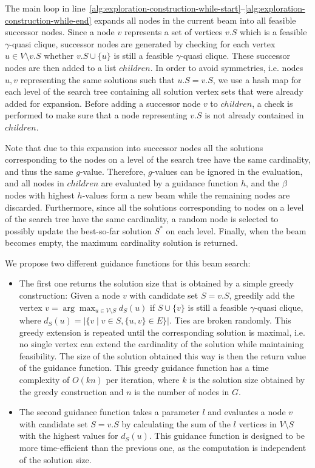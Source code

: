 \documentclass[draft,final]{vutinfth} %
\begin{document}
The main loop in line~\ref{alg:exploration-construction-while-start}--\ref{alg:exploration-construction-while-end} expands all nodes in the current beam into all feasible successor nodes. 
Since a node $v$ represents a set of vertices $\mathit{v.S}$ which is a feasible $\gamma$-quasi clique, successor nodes are generated by checking for each vertex $u \in V \setminus \mathit{v.S}$ whether $\mathit{v.S} \cup \{u\}$ is still a feasible $\gamma$-quasi clique. 
These successor nodes are then added to a list $\mathit{children}$. 
In order to avoid symmetries, i.e. nodes $u,v$ representing the same solutions such that $u.S = v.S$, we use a hash map for each level of the search tree containing all solution vertex sets that were already added for expansion. Before adding a successor node $v$ to $\mathit{children}$, a check is performed to make sure that a node representing $v.S$ is not already contained in $\mathit{children}$.  

Note that due to this expansion into successor nodes all the solutions corresponding to the nodes on a level of the search tree have the same cardinality, and thus the same $g$-value.  
Therefore, $g$-values can be ignored in the evaluation, and all nodes in $\mathit{children}$ are evaluated by a guidance function $h$, and the $\beta$ nodes with highest $h$-values form a new beam while the remaining nodes are discarded. 
Furthermore, since all the solutions corresponding to nodes on a level of the search tree have the same cardinality, a random node is selected to possibly update the best-so-far solution $S^*$ on each level.
Finally, when the beam becomes empty, the maximum cardinality solution is returned. 

We propose two different guidance functions for this beam search: 
\begin{itemize}
    \item The first one returns the solution size that is obtained by a simple greedy construction: Given a node $v$ with candidate set $S = v.S$, greedily add the vertex $v = \arg \max_{u \in V \setminus S} d_S(u)$ if $S \cup \{v\}$ is still a feasible $\gamma$-quasi clique, where $d_S(u) = |\{v \mid v \in S, \{u,v\} \in E \}|$. 
    Ties are broken randomly. This greedy extension is repeated until the corresponding solution is maximal, i.e. no single vertex can extend the cardinality of the solution while maintaining feasibility. 
    The size of the solution obtained this way is then the return value of the guidance function. This greedy guidance function has a time complexity of $O(kn)$ per iteration, where $k$ is the solution size obtained by the greedy construction and $n$ is the number of nodes in $G$. 
    \item The second guidance function takes a parameter $l$ and evaluates a node $v$ with candidate set $S = v.S$ by calculating the sum of the $l$ vertices in $V \setminus S$ with the highest values for $d_S(u)$. This guidance function is designed to be more time-efficient than the previous one, as the computation is independent of the solution size. 
\end{itemize}
\end{document}
